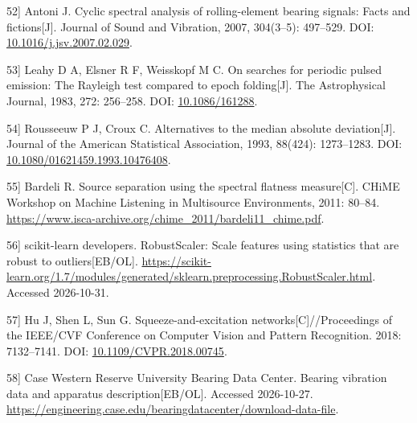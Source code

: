 \documentclass[UTF8,12pt,openany,twoside]{ctexbook}
\numberwithin{equation}{chapter}
\begin{document}
\noindent\begingroup\samepage {[}52{]} Antoni J. Cyclic spectral analysis of rolling-element bearing signals: Facts and fictions[J]. Journal of Sound and Vibration, 2007, 304(3--5): 497--529. DOI: \url{10.1016/j.jsv.2007.02.029}.\par\endgroup

\noindent\begingroup\samepage {[}53{]} Leahy D A, Elsner R F, Weisskopf M C. On searches for periodic pulsed emission: The Rayleigh test compared to epoch folding[J]. The Astrophysical Journal, 1983, 272: 256--258. DOI: \url{10.1086/161288}.\par\endgroup

\noindent\begingroup\samepage {[}54{]} Rousseeuw P J, Croux C. Alternatives to the median absolute deviation[J]. Journal of the American Statistical Association, 1993, 88(424): 1273--1283. DOI: \url{10.1080/01621459.1993.10476408}.\par\endgroup

\noindent\begingroup\samepage {[}55{]} Bardeli R. Source separation using the spectral flatness measure[C]. CHiME Workshop on Machine Listening in Multisource Environments, 2011: 80--84. \url{https://www.isca-archive.org/chime_2011/bardeli11_chime.pdf}.\par\endgroup

\noindent\begingroup\samepage {[}56{]} scikit-learn developers. RobustScaler: Scale features using statistics that are robust to outliers[EB/OL]. \url{https://scikit-learn.org/1.7/modules/generated/sklearn.preprocessing.RobustScaler.html}. Accessed 2026-10-31.\par\endgroup

\noindent\begingroup\samepage {[}57{]} Hu J, Shen L, Sun G. Squeeze-and-excitation networks[C]//Proceedings of the IEEE/CVF Conference on Computer Vision and Pattern Recognition. 2018: 7132--7141. DOI: \url{10.1109/CVPR.2018.00745}.\par\endgroup

\noindent\begingroup\samepage {[}58{]} Case Western Reserve University Bearing Data Center. Bearing vibration data and apparatus description[EB/OL]. Accessed 2026-10-27. \url{https://engineering.case.edu/bearingdatacenter/download-data-file}.\par\endgroup
\end{document}

